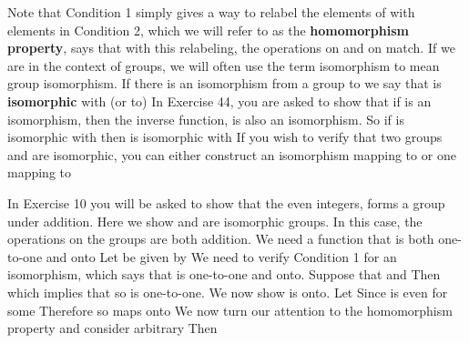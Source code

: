 \documentclass[11pt,oneside]{article}
\begin{document}
\begin{BookBody}
\noindent Note that Condition 1 simply gives a way to relabel the elements of  with elements in  Condition 2, which we will refer to as the\textbf{ homomorphism property}, says that with this relabeling, the operations  on  and  on  match. If we are in the context of groups, we will often use the term isomorphism to mean group isomorphism. If there is an isomorphism from a group  to  we say that  is\textbf{ isomorphic} with (or to)  In Exercise 44, you are asked to show that if  is an isomorphism, then  the inverse function, is also an isomorphism. So if  is isomorphic with  then  is isomorphic with  If you wish to verify that two groups and  are isomorphic, you can either construct an isomorphism mapping  to  or one mapping  to 

 In Exercise 10 you will be asked to show that  the even integers, forms a group under addition. Here we show  and  are isomorphic groups. In this case, the operations on the groups are both addition. We need a function  that is both one-to-one and onto  Let  be given by  We need to verify Condition 1 for an isomorphism, which says that  is one-to-one and onto. Suppose that  and  Then  which implies that  so  is one-to-one. We now show  
is onto. Let  Since  is even for some  Therefore so  maps onto  We now turn our attention to the homomorphism property and consider arbitrary  Then

\end{BookBody}
\end{document}
